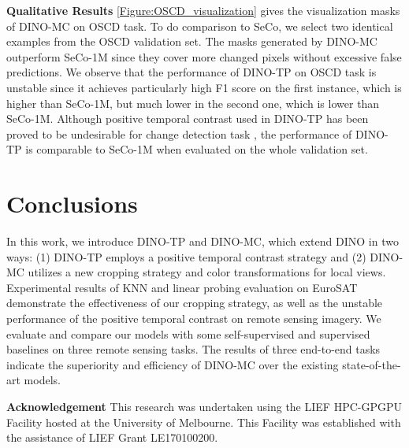 \documentclass[10pt,twocolumn,letterpaper]{article}
\begin{document}
\textbf{Qualitative Results}
\cref{Figure:OSCD_visualization} gives the visualization masks of DINO-MC on OSCD task.
To do comparison to SeCo, we select two identical examples from the OSCD validation set.
The masks generated by DINO-MC outperform SeCo-1M since they cover more changed pixels without excessive false predictions.
We observe that the performance of DINO-TP on OSCD task is unstable since it achieves particularly high F1 score on the first instance, which is  higher than SeCo-1M, but much lower in the second one, which is  lower than SeCo-1M. 
Although positive temporal contrast used in DINO-TP has been proved to be undesirable for change detection task \cite{manas2021seasonal}, the performance of DINO-TP is comparable to SeCo-1M when evaluated on the whole validation set.




\section{Conclusions}
In this work, we introduce DINO-TP and DINO-MC, which extend DINO in two ways: (1) DINO-TP employs a positive temporal contrast strategy and (2) DINO-MC utilizes a new cropping strategy and color transformations for local views.
Experimental results of KNN and linear probing evaluation on EuroSAT demonstrate the effectiveness of our cropping strategy, as well as the unstable performance of the positive temporal contrast on remote sensing imagery.
We evaluate and compare our models with some self-supervised and supervised baselines on three remote sensing tasks.
The results of three end-to-end tasks indicate the superiority and efficiency of DINO-MC over the existing state-of-the-art models.




\textbf{Acknowledgement}
This research was undertaken using the LIEF HPC-GPGPU Facility hosted at the University of Melbourne. This Facility was established with the assistance of LIEF Grant LE170100200.

{\small


}
\end{document}
